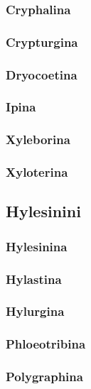 \documentclass[paper=a4, fontsize=11pt]{scrartcl}
\numberwithin{equation}{section} %
\numberwithin{figure}{section} %
\numberwithin{table}{section} %
\begin{document}
\subsubsection{Cryphalina}
\subsubsection{Crypturgina}
\subsubsection{Dryocoetina}
\subsubsection{Ipina}
\subsubsection{Xyleborina}
\subsubsection{Xyloterina}

\subsection{Hylesinini}
\subsubsection{Hylesinina}
\subsubsection{Hylastina}
\subsubsection{Hylurgina}
\subsubsection{Phloeotribina}
\subsubsection{Polygraphina}

\newpage


\singlespacing
{}

\end{document}
